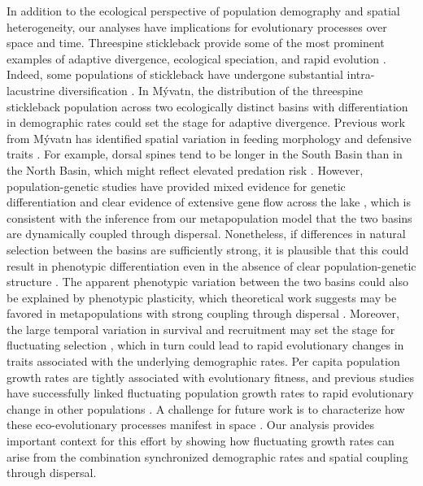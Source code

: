 \documentclass[11pt]{article}
\begin{document}
In addition to the ecological perspective 
of population demography and spatial heterogeneity, 
our analyses have implications for evolutionary processes over space and time. 
Threespine stickleback provide some of the most prominent examples of adaptive divergence, 
ecological speciation, and rapid evolution \citep[reviewed in][]{hendry2013stickleback}. 
Indeed, some populations of stickleback 
have undergone substantial intra-lacustrine diversification 
\citep{maciejewski2020microhabitat}. 
In M\'{y}vatn, the distribution of the threespine stickleback population across 
two ecologically distinct basins with differentiation in demographic rates 
could set the stage for adaptive divergence. 
Previous work from M\'{y}vatn has identified spatial variation 
in feeding morphology and defensive traits \citep{millet2013}. 
For example, dorsal spines tend to be longer in the South Basin than in the North Basin,
which might reflect elevated predation risk
\citep{hoogland1956spines, reimchen2002temporal}. 
However, population-genetic studies have provided mixed evidence 
for genetic differentiation and clear evidence of extensive gene flow 
across the lake \citep{olafsdottir2007postglacial, millet2013}, 
which is consistent with the inference from our metapopulation model that the two basins 
are dynamically coupled through dispersal. 
Nonetheless, if differences in natural selection between the basins are sufficiently strong, 
it is plausible that this could result in phenotypic differentiation 
even in the absence of clear population-genetic structure 
\citep{rasanen2008disentangling}. 
The apparent phenotypic variation between the two basins 
could also be explained by phenotypic plasticity, 
which theoretical work suggests may be favored in metapopulations 
with strong coupling through dispersal \citep{sultan2002metapopulation}. 
Moreover, the large temporal variation in survival and recruitment may set the stage 
for fluctuating selection \citep{siepielski2009s}, 
which in turn could lead to rapid evolutionary changes in traits associated 
with the underlying demographic rates. 
Per capita population growth rates are tightly associated with evolutionary fitness, 
and previous studies have successfully linked fluctuating population growth rates 
to rapid evolutionary change in other populations 
\citep{coulson2008dynamics, engen2014estimating, de2019stage}.
A challenge for future work is to characterize how these eco-evolutionary processes
manifest in space
\citep{hanski2012eco, brunner2019diversity}.
Our analysis provides important context for this effort by showing 
how fluctuating growth rates can arise from the combination synchronized demographic rates
and spatial coupling through dispersal.
\end{document}
